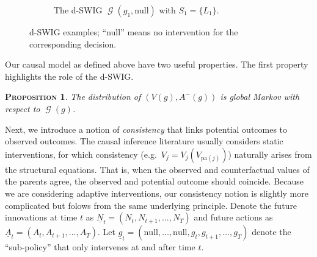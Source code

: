 \documentclass[12pt,a4paper]{article}
\newtheorem{proposition}[theorem]{\normalfont\scshape  Proposition}
\theoremstyle{definition}
\newcommand{\pa}[0]{\text{pa}}
\DeclareMathOperator{\gG}{\mathscr{G}}
\begin{document}
\begin{figure}[t]
    \begin{subfigure}[b]{\textwidth}
        \centering
    \caption{The d-SWIG $\gG(g_1, \text{null})$ with $S_1 = \{L_1\}$.}
    \label{fig:d-SWIG-g1}
    \end{subfigure}

    \caption{d-SWIG examples; ``null'' means no intervention
      for the corresponding decision.}
    \label{fig:d-SWIG-examples}
\end{figure}

Our causal model as defined above have two useful properties. The
first property highlights the role of the d-SWIG.
\begin{proposition} \label{prop:g-markov}
  The distribution of $(V(g), A^-(g))$ is global Markov with respect
  to $\gG(g)$.
\end{proposition}
Next, we introduce a notion of \emph{consistency} that links
potential outcomes to observed outcomes. The causal inference
literature usually considers static interventions, for which
consistency (e.g.\ $V_j = V_j(V_{\pa(j)})$) naturally arises from the
structural equations. That is, when the observed and
counterfactual values of the parents agree, the observed and potential
outcome should coincide. Because we are considering adaptive
interventions, our consistency notion is slightly more complicated but folows from the same
underlying principle. Denote the future innovations at time $t$ as
$\underline{N}_t = (N_t, N_{t+1}, \dots, N_T)$ and future actions as
$\underline{A}_t = (A_t, A_{t+1}, \dots, A_T)$. Let $\underline{g}_t =
(\text{null}, \dots, \text{null}, g_t, g_{t+1}, \dots, g_T)$ denote
the ``sub-policy'' that only intervenes at and after time $t$. %
\end{document}
